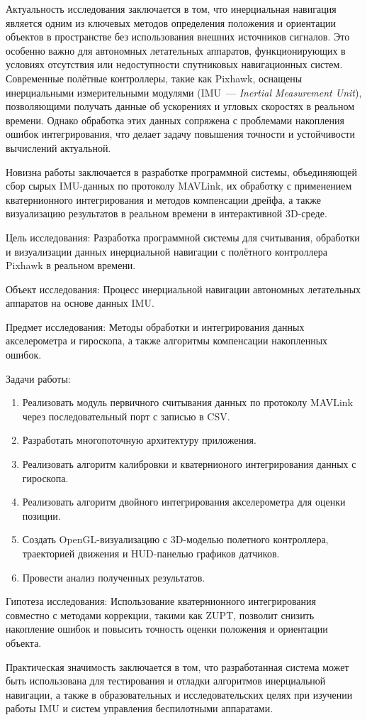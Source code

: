 \documentclass[../main.tex]{subfiles}
\begin{document}
	
	Актуальность исследования заключается в том, что инерциальная навигация является одним из ключевых
	методов определения положения и ориентации объектов в пространстве 
	без использования внешних источников сигналов. Это особенно важно для 
	автономных летательных аппаратов, функционирующих в условиях отсутствия или 
	недоступности спутниковых навигационных систем. Современные полётные 
	контроллеры, такие как Pixhawk, оснащены инерциальными измерительными 
	модулями (IMU~--- \textit{Inertial Measurement Unit}), позволяющими получать
	данные об ускорениях и угловых скоростях в реальном времени. Однако 
	обработка этих данных сопряжена с проблемами накопления ошибок интегрирования,
	что делает задачу повышения точности и устойчивости вычислений актуальной. 
	
    Новизна работы заключается в разработке программной системы, объединяющей 
	сбор сырых IMU-данных по протоколу MAVLink, их обработку с применением
	кватернионного интегрирования и методов компенсации дрейфа, а также 
	визуализацию результатов в реальном времени в интерактивной 3D-среде.

	Цель исследования: Разработка программной системы для считывания, обработки 
	и визуализации данных инерциальной навигации с полётного контроллера Pixhawk 
	в реальном времени.
	
	Объект исследования: Процесс инерциальной навигации автономных летательных 
	аппаратов на основе данных IMU.
	
	Предмет исследования: Методы обработки и интегрирования данных акселерометра
	и гироскопа, а также алгоритмы компенсации накопленных ошибок.
	
	Задачи работы:
	\begin{enumerate}[leftmargin=*]
		\item Реализовать модуль первичного считывания данных по протоколу
			MAVLink через последовательный порт с записью в CSV.
		\item Разработать многопоточную архитектуру приложения.
		\item Реализовать алгоритм калибровки и кватернионого интегрирования
			данных с гироскопа.
		\item Реализовать алгоритм двойного интегрирования акселерометра для
			оценки позиции.
		\item Создать OpenGL-визуализацию с 3D-моделью полетного контроллера,
		траекторией движения и HUD-панелью графиков датчиков.
		\item Провести анализ полученных результатов.
	\end{enumerate}

    Гипотеза исследования: Использование кватернионного
	интегрирования совместно с методами коррекции, такими как ZUPT, 
	позволит снизить накопление ошибок и повысить точность оценки 
	положения и ориентации объекта.

	Практическая значимость заключается в том, что разработанная система
	может быть использована для тестирования и отладки алгоритмов инерциальной
	навигации, а также в образовательных и исследовательских целях 
	при изучении работы IMU и систем управления беспилотными аппаратами.
\end{document}
